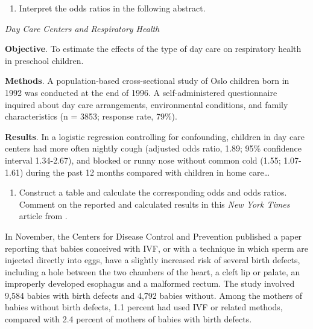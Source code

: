 \documentclass[
]{krantz}
\providecommand{\tightlist}{%
  \setlength{\itemsep}{0pt}\setlength{\parskip}{0pt}}
\renewenvironment{quote}{\begin{VF}}{\end{VF}}
\begin{document}
\begin{enumerate}
\def\labelenumi{\arabic{enumi}.}
\setcounter{enumi}{1}
\tightlist
\item
  Interpret the odds ratios in the following abstract.
\end{enumerate}

\emph{Day Care Centers and Respiratory Health} \citep{Nafstad1999}

\begin{quote}
\textbf{Objective}. To estimate the effects of the type of day care on respiratory health in preschool children.
\end{quote}

\begin{quote}
\textbf{Methods}. A population-based cross-sectional study of Oslo children born in 1992 was conducted at the end of 1996. A self-administered questionnaire inquired about day care arrangements, environmental conditions, and family characteristics (n = 3853; response rate, 79\%).
\end{quote}

\begin{quote}
\textbf{Results}. In a logistic regression controlling for confounding, children in day care centers had more often nightly cough (adjusted odds ratio, 1.89; 95\% confidence interval 1.34-2.67), and blocked or runny nose without common cold (1.55; 1.07-1.61) during the past 12 months compared with children in home care\ldots{}
\end{quote}

\begin{enumerate}
\def\labelenumi{\arabic{enumi}.}
\setcounter{enumi}{2}
\tightlist
\item
  Construct a table and calculate the corresponding odds and odds ratios. Comment on the reported and calculated results in this \emph{New York Times} article from \citet{Kolata2009}.
\end{enumerate}

\begin{quote}
In November, the Centers for Disease Control and Prevention published a paper reporting that babies conceived with IVF, or with a technique in which sperm are injected directly into eggs, have a slightly increased risk of several birth defects, including a hole between the two chambers of the heart, a cleft lip or palate, an improperly developed esophagus and a malformed rectum. The study involved 9,584 babies with birth defects and 4,792 babies without. Among the mothers of babies without birth defects, 1.1 percent had used IVF or related methods, compared with 2.4 percent of mothers of babies with birth defects.
\end{quote}
\end{document}
